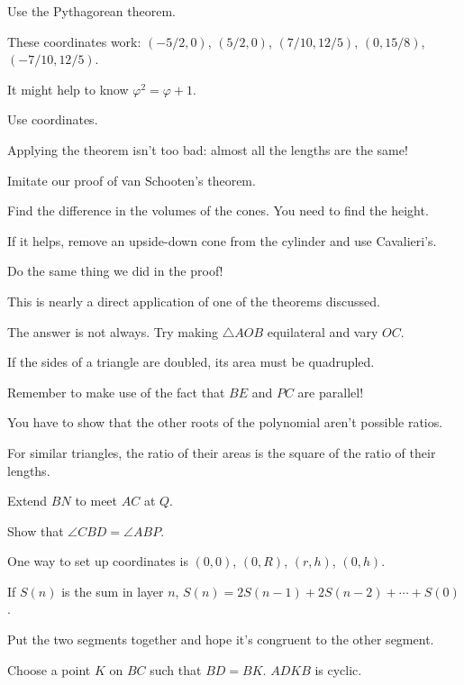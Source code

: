 \documentclass[11pt,paper=letter]{scrartcl}
\begin{document}
\begin{enumthin}[leftmargin=0pt]
\item \label{h:bf11} Use the Pythagorean theorem. 
\item \label{h:pc53} These coordinates work: $(-5/2, 0)$, $(5/2, 0)$, $(7/10, 12/5)$, $(0, 15/8)$, $(-7/10, 12/5)$.
\item \label{h:dt21} It might help to know $\varphi^2 = \varphi + 1$.
\item \label{h:rd43} Use coordinates.
\item \label{h:eq41} Applying the theorem isn't too bad: almost all the lengths are the same!
\item \label{h:gb31} Imitate our proof of van Schooten's theorem.
\item \label{h:pc42} Find the difference in the volumes of the cones. You need to find the height.
\item \label{h:np13} If it helps, remove an upside-down cone from the cylinder and use Cavalieri's.
\item \label{h:pt31} Do the same thing we did in the proof!
\item \label{h:gb81} This is nearly a direct application of one of the theorems discussed.
\item \label{h:dg31} The answer is not always. Try making $\triangle AOB$ equilateral and vary $OC$.
\item \label{h:vt42} If the sides of a triangle are doubled, its area must be quadrupled.
\item \label{h:vs04} Remember to make use of the fact that $BE$ and $PC$ are parallel!
\item \label{h:dt24} You have to show that the other roots of the polynomial aren't possible ratios.
\item \label{h:rd62} For similar triangles, the ratio of their areas is the square of the ratio of their lengths.
\item \label{h:gb61} Extend $BN$ to meet $AC$ at $Q$.
\item \label{h:pt01} Show that $\angle CBD = \angle ABP$.
\item \label{h:pc41} One way to set up coordinates is $(0, 0)$, $(0, R)$, $(r, h)$, $(0, h)$.
\item \label{h:dt32} If $S(n)$ is the sum in layer $n$, $S(n) = 2S(n-1) + 2S(n-2) + \cdots + S(0)$.
\item \label{h:vs41} Put the two segments together and hope it's congruent to the other segment.
\item \label{h:gb32} Choose a point $K$ on $BC$ such that $BD=BK$. $ADKB$ is cyclic.

\end{enumthin}
\end{document}
